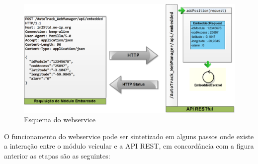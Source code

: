 \begin{figure}[!htb]
	\centering
	\includegraphics[width=\textwidth]{figures/RESTMapp.png}
	\caption{Esquema do webservice}
	\label{fig:webmanwebservice}
\end{figure}

O funcionamento do webservice pode ser sintetizado em alguns passos onde existe a interação entre o módulo veicular e a API REST, em concordância com a figura anterior as etapas são as seguintes: 

